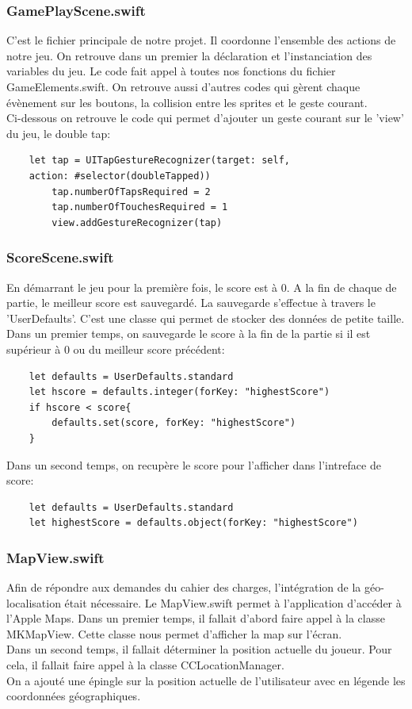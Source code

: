 \documentclass{article}
\begin{document}
\subsubsection{GamePlayScene.swift}
C'est le fichier principale de notre projet. Il coordonne l'ensemble des actions de notre jeu. On retrouve dans un premier la déclaration et l'instanciation des variables du jeu. Le code fait appel à toutes nos fonctions du fichier GameElements.swift. On retrouve aussi d'autres codes qui gèrent chaque évènement sur les boutons, la collision entre les sprites et le geste courant.\\

\newpage
Ci-dessous on retrouve le code qui permet d'ajouter un geste courant sur le 'view' du jeu, le double tap: 
\begin{verbatim}
    let tap = UITapGestureRecognizer(target: self, 
    action: #selector(doubleTapped))
        tap.numberOfTapsRequired = 2
        tap.numberOfTouchesRequired = 1
        view.addGestureRecognizer(tap)
\end{verbatim}

\subsubsection{ScoreScene.swift}
En démarrant le jeu pour la première fois, le score est à 0. A la fin de chaque de partie, le meilleur score est sauvegardé. La sauvegarde s'effectue à travers le 'UserDefaults'. C'est une classe qui permet de stocker des données de petite taille. \\
Dans un premier temps, on sauvegarde le score à la fin de la partie si il est supérieur à 0 ou du meilleur score précédent: 
\begin{verbatim}
    let defaults = UserDefaults.standard
    let hscore = defaults.integer(forKey: "highestScore")
    if hscore < score{
        defaults.set(score, forKey: "highestScore")
    }                    
\end{verbatim}

Dans un second temps, on recupère le score pour l'afficher dans l'intreface de score: 

\begin{verbatim}
    let defaults = UserDefaults.standard
    let highestScore = defaults.object(forKey: "highestScore")
\end{verbatim}

\subsubsection{MapView.swift}
Afin de répondre aux demandes du cahier des charges, l'intégration de la géo-localisation était nécessaire. Le MapView.swift permet à l'application d'accéder à l'Apple Maps. Dans un premier temps, il fallait d'abord faire appel à la classe MKMapView. Cette classe nous permet d'afficher la map sur l'écran.\\
Dans un second temps, il fallait déterminer la position actuelle du joueur. Pour cela, il fallait faire appel à la classe CCLocationManager.\\
On a ajouté une épingle sur la position actuelle de l'utilisateur avec en légende les coordonnées géographiques.
\end{document}
